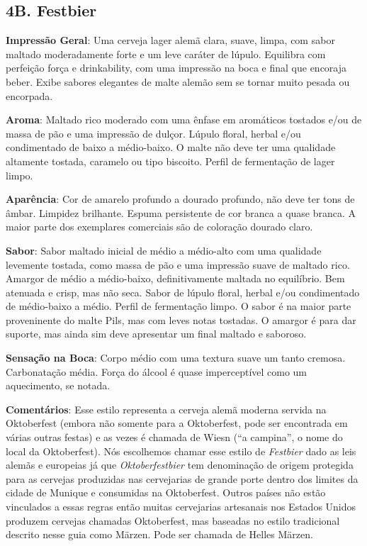 \subsection*{4B. Festbier}
\textbf{Impressão Geral}: Uma cerveja lager alemã clara, suave, limpa, com sabor maltado moderadamente forte e um leve caráter de lúpulo. Equilibra com perfeição força e drinkability, com uma impressão na boca e final que encoraja beber. Exibe sabores elegantes de malte alemão sem se tornar muito pesada ou encorpada.

\textbf{Aroma}: Maltado rico moderado com uma ênfase em aromáticos tostados e/ou de massa de pão e uma impressão de dulçor. Lúpulo floral, herbal e/ou condimentado de baixo a médio-baixo. O malte não deve ter uma qualidade altamente tostada, caramelo ou tipo biscoito. Perfil de fermentação de lager limpo.

\textbf{Aparência}: Cor de amarelo profundo a dourado profundo, não deve ter tons de âmbar. Limpidez brilhante. Espuma persistente de cor branca a quase branca. A maior parte dos exemplares comerciais são de coloração dourado claro.

\textbf{Sabor}: Sabor maltado inicial de médio a médio-alto com uma qualidade levemente tostada, como massa de pão e uma impressão suave de maltado rico. Amargor de médio a médio-baixo, definitivamente maltada no equilíbrio. Bem atenuada e crisp, mas não seca. Sabor de lúpulo floral, herbal e/ou condimentado de médio-baixo a médio. Perfil de fermentação limpo. O sabor é na maior parte proveninente do malte Pils, mas com leves notas tostadas. O amargor é para dar suporte, mas ainda sim deve apresentar um final maltado e saboroso.

\textbf{Sensação na Boca}: Corpo médio com uma textura suave um tanto cremosa. Carbonatação média. Força do álcool é quase imperceptível como um aquecimento, se notada.

\textbf{Comentários}: Esse estilo representa a cerveja alemã moderna servida na Oktoberfest (embora não somente para a Oktoberfest, pode ser encontrada em várias outras festas) e as vezes é chamada de Wiesn (“a campina”, o nome do local da Oktoberfest). Nós escolhemos chamar esse estilo de \textit{Festbier} dado as leis alemãs e europeias já que \textit{Oktoberfestbier} tem denominação de origem protegida para as cervejas produzidas nas cervejarias de grande porte dentro dos limites da cidade de Munique e consumidas na Oktoberfest. Outros países não estão vinculados a essas regras então muitas cervejarias artesanais nos Estados Unidos produzem cervejas chamadas Oktoberfest, mas baseadas no estilo tradicional descrito nesse guia como Märzen. Pode ser chamada de Helles Märzen.

